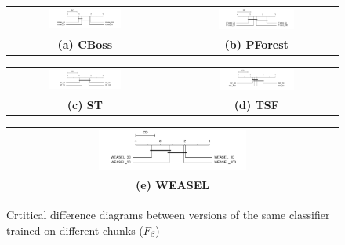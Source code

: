 \begin{figure} [!htb]
    \centering
    \begin{tabular}{ccc}
    \includegraphics[width=0.49\textwidth]{cd_f_score_within_cboss.png} & & 
    \includegraphics[width=0.49\textwidth]{cd_f_score_within_pforest.png} \\
    \textbf{(a) CBoss} & & \textbf{(b) PForest} \\[6pt]
    \end{tabular}
    \begin{tabular}{ccc}
    \includegraphics[width=0.49\textwidth]{cd_f_score_within_st.png} & & 
    \includegraphics[width=0.49\textwidth]{cd_f_score_within_tsf.png} \\
    \textbf{(c) ST} & & \textbf{(d) TSF}  \\[6pt]
    \end{tabular}
    \begin{tabular}{ccc}
    & \includegraphics[width=0.49\textwidth]{cd_f_score_within_weasel.png} & \\
    & \textbf{(e) WEASEL} & \\[6pt]
    \end{tabular}
    \caption{Crtitical difference diagrams between versions of the same classifier trained on different chunks ($F_{\beta}$)}
    \label{fig:within}
\end{figure}



